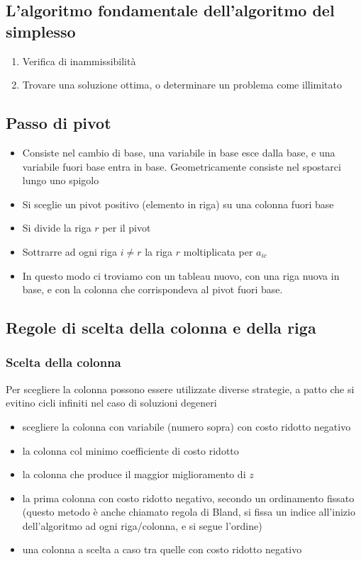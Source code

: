 \documentclass[11pt, oneside]{article}   	%
\begin{document}
\subsection{L'algoritmo fondamentale dell'algoritmo del simplesso}
\begin{enumerate}
\item Verifica di inammissibilità
\item Trovare una soluzione ottima, o determinare un problema come illimitato
\end{enumerate}
\subsection{Passo di pivot}
\begin{itemize}
\item Consiste nel cambio di base, una variabile in base esce dalla base, e una variabile fuori base entra in base. Geometricamente consiste nel spostarci lungo uno spigolo
\item Si sceglie un pivot positivo (elemento in riga) su una colonna fuori base
\item Si divide la riga $r$ per il pivot
\item Sottrarre ad ogni riga $i \neq r$ la riga $r$ moltiplicata per $a_{ic}$
\item In questo modo ci troviamo con un tableau nuovo, con una riga nuova in base, e con la colonna che corrispondeva al pivot fuori base.
\end{itemize}


\subsection{Regole di scelta della colonna e della riga}
\subsubsection{Scelta della colonna}
Per scegliere la colonna possono essere utilizzate diverse strategie, a patto che si evitino cicli infiniti nel caso di soluzioni degeneri
\begin{itemize}
\item scegliere la colonna con variabile (numero sopra) con costo ridotto negativo
\item la colonna col minimo coefficiente di costo ridotto
\item la colonna che produce il maggior miglioramento di $z$
\item la prima colonna con costo ridotto negativo, secondo un ordinamento fissato (questo metodo è anche chiamato regola di Bland, si fissa un indice all'inizio dell'algoritmo ad ogni riga/colonna, e si segue l'ordine)
\item una colonna a scelta a caso tra quelle con costo ridotto negativo
\end{itemize}
\end{document}
